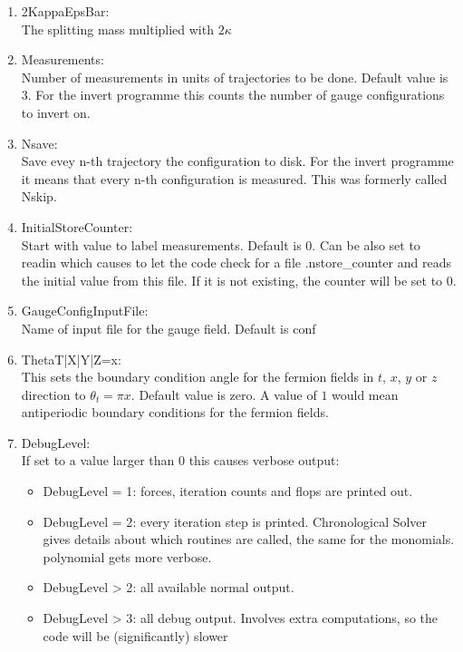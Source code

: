 \begin{enumerate}
\item {\ttfamily 2KappaEpsBar}:\\
  The splitting mass multiplied with $2\kappa$

\item {\ttfamily Measurements}:\\
  Number of measurements in units of trajectories to be done. Default
  value is $3$. For the {\ttfamily invert} programme this counts the
  number of gauge configurations to invert on.

\item {\ttfamily Nsave}:\\
  Save evey n-th trajectory the configuration to disk.
  For the {\ttfamily invert} programme it means that every n-th
  configuration is measured. This was formerly called {\ttfamily
    Nskip}.

\item {\ttfamily InitialStoreCounter}:\\
  Start with value to label measurements. Default is $0$. Can be also
  set to {\ttfamily readin} which causes to let the code check for a
  file {\ttfamily .nstore\_counter} and reads the initial value from
  this file. If it is not existing, the counter will be set to $0$.

\item {\ttfamily GaugeConfigInputFile}:\\
  Name of input file for the gauge field. Default is {\ttfamily conf}

\item {\ttfamily ThetaT|X|Y|Z=x}:\\
  This sets the boundary condition angle for the fermion fields in
  $t$, $x$, $y$ or $z$ direction to $\theta_t = \pi x$. Default value is
  zero. A value of $1$ would mean antiperiodic boundary conditions
  for the fermion fields.

\item {\ttfamily DebugLevel}:\\
  If set to a value larger than $0$ this causes verbose output:
  \begin{itemize}
  \item {\ttfamily DebugLevel = 1}: forces, iteration counts and flops are printed out.
  \item {\ttfamily DebugLevel = 2}: every iteration step is
    printed. Chronological Solver gives details about which routines
    are called, the same for the monomials. polynomial gets more verbose.
  \item {\ttfamily DebugLevel > 2}: all available normal output.
  \item {\ttfamily DebugLevel > 3}: all debug output. Involves extra
    computations, so the code will be (significantly) slower
  \end{itemize}


\end{enumerate}
